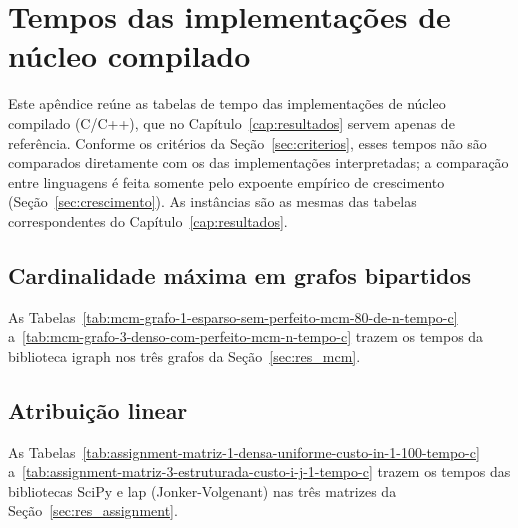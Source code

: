 
\chapter{Tempos das implementações de núcleo compilado}
\label{ap:compilados}

Este apêndice reúne as tabelas de tempo das implementações de núcleo compilado
(C/C++), que no Capítulo~\ref{cap:resultados} servem apenas de referência.
Conforme os critérios da Seção~\ref{sec:criterios}, esses tempos não são
comparados diretamente com os das implementações interpretadas; a comparação
entre linguagens é feita somente pelo expoente empírico de crescimento
(Seção~\ref{sec:crescimento}). As instâncias são as mesmas das tabelas
correspondentes do Capítulo~\ref{cap:resultados}.

\section{Cardinalidade máxima em grafos bipartidos}

As Tabelas~\ref{tab:mcm-grafo-1-esparso-sem-perfeito-mcm-80-de-n-tempo-c}
a~\ref{tab:mcm-grafo-3-denso-com-perfeito-mcm-n-tempo-c} trazem os tempos da
biblioteca igraph nos três grafos da Seção~\ref{sec:res_mcm}.





\section{Atribuição linear}

As Tabelas~\ref{tab:assignment-matriz-1-densa-uniforme-custo-in-1-100-tempo-c}
a~\ref{tab:assignment-matriz-3-estruturada-custo-i-j-1-tempo-c} trazem os tempos
das bibliotecas SciPy e lap (Jonker-Volgenant) nas três matrizes da
Seção~\ref{sec:res_assignment}.




